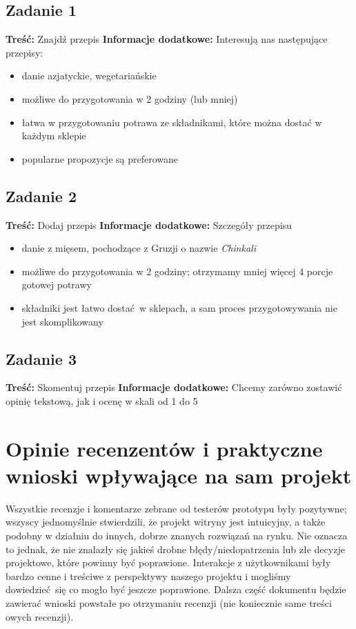\documentclass{article}
\begin{document}
\subsection{Zadanie 1}
\textbf{Treść:} Znajdź przepis\newline
\textbf{Informacje dodatkowe:} Interesują nas następujące przepisy:
\begin{itemize}
  \item danie azjatyckie, wegetariańskie
  \item możliwe do przygotowania w 2 godziny (lub mniej)
  \item łatwa w przygotowaniu potrawa ze składnikami, które można dostać w każdym sklepie
  \item popularne propozycje są preferowane
\end{itemize}

\subsection{Zadanie 2}
\textbf{Treść:} Dodaj przepis\newline
\textbf{Informacje dodatkowe:} Szczegóły przepisu
\begin{itemize}
  \item danie z mięsem, pochodzące z Gruzji o nazwie \textit{Chinkali}
  \item możliwe do przygotowania w 2 godziny; otrzymamy mniej więcej 4 porcje gotowej potrawy
  \item składniki jest łatwo dostać w sklepach, a sam proces przygotowywania nie jest skomplikowany
\end{itemize}

\subsection{Zadanie 3}
\textbf{Treść:} Skomentuj przepis\newline
\textbf{Informacje dodatkowe:} Chcemy zarówno zostawić opinię tekstową, jak i ocenę w skali od 1 do 5

\section{Opinie recenzentów i praktyczne wnioski wpływające na sam projekt}
Wszystkie recenzje i komentarze zebrane od testerów prototypu były pozytywne; wszyscy jednomyślnie stwierdzili, że projekt witryny jest intuicyjny, a także podobny w działniu 
do innych, dobrze znanych rozwiązań na rynku. Nie oznacza to jednak, że nie znalazły się jakieś drobne błędy/niedopatrzenia lub złe decyzje projektowe, które powinny być poprawione.
Interakcje z użytkownikami były bardzo cenne i treściwe z perspektywy naszego projektu i mogliśmy dowiedzieć się co mogło być jeszcze poprawione. Dalsza część dokumentu będzie
zawierać wnioski powstałe po otrzymaniu recenzji (nie koniecznie same treści owych recenzji).
\end{document}
